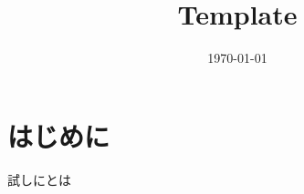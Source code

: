 \documentclass[a4paper,11pt,onecolumn]{ltjsarticle}
\title{Template}
\author{}
\date{\today}
\begin{document}
\pagestyle{fancy}
\rhead{\thepage}
\cfoot{}
\renewcommand{\footrulewidth}{0.4pt}

\section{はじめに}

試しにとは


\clearpage

% 
% 
\printindex
\end{document}
